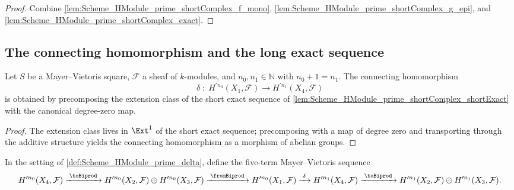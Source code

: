 \begin{proof}

  \leanok
  Combine \cref{lem:Scheme_HModule_prime_shortComplex_f_mono}, \cref{lem:Scheme_HModule_prime_shortComplex_g_epi}, and \cref{lem:Scheme_HModule_prime_shortComplex_exact}.
\end{proof}

\subsection{The connecting homomorphism and the long exact sequence}

\begin{definition}\leanok
  \label{def:Scheme_HModule_prime_delta}

  Let \(S\) be a Mayer--Vietoris square, \(\mathcal F\) a sheaf of \(k\)-modules, and \(n_0, n_1 \in \mathbb N\) with \(n_0 + 1 = n_1\). The connecting homomorphism
  \[
    \delta \;:\; H^{\prime n_0}(X_1, \mathcal F) \longrightarrow H^{\prime n_1}(X_4, \mathcal F)
  \]
  is obtained by precomposing the extension class of the short exact sequence of \cref{lem:Scheme_HModule_prime_shortComplex_shortExact} with the canonical degree-zero map.
\end{definition}

\begin{proof}

  \leanok
  The extension class lives in \(\Ext^1\) of the short exact sequence; precomposing with a map of degree zero and transporting through the additive structure yields the connecting homomorphism as a morphism of abelian groups.
\end{proof}

\begin{definition}\leanok
  \label{def:Scheme_HModule_prime_sequence}

  In the setting of \cref{def:Scheme_HModule_prime_delta}, define the five-term Mayer--Vietoris sequence
  \[
    H^{\prime n_0}(X_4, \mathcal F) \xrightarrow{\;\toBiprod\;} H^{\prime n_0}(X_2, \mathcal F) \oplus H^{\prime n_0}(X_3, \mathcal F) \xrightarrow{\;\fromBiprod\;} H^{\prime n_0}(X_1, \mathcal F) \xrightarrow{\;\delta\;} H^{\prime n_1}(X_4, \mathcal F) \xrightarrow{\;\toBiprod\;} H^{\prime n_1}(X_2, \mathcal F) \oplus H^{\prime n_1}(X_3, \mathcal F).
  \]
\end{definition}

